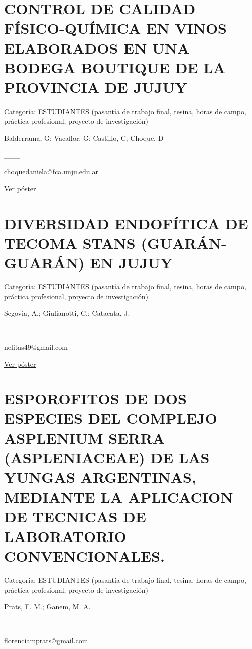 \documentclass[
  spanish,
  letterpaper,
  DIV=11,
  numbers=noendperiod]{scrreprt}
\begin{document}
\section{CONTROL DE CALIDAD FÍSICO-QUÍMICA EN VINOS ELABORADOS EN UNA
BODEGA BOUTIQUE DE LA PROVINCIA DE
JUJUY}\label{control-de-calidad-fuxedsico-quuxedmica-en-vinos-elaborados-en-una-bodega-boutique-de-la-provincia-de-jujuy}

Categoría: ESTUDIANTES (pasantía de trabajo final, tesina, horas de
campo, práctica profesional, proyecto de investigación)

Balderrama, G; Vacaflor, G; Castillo, C; Choque, D

\_\_\_

choquedaniela@fca.unju.edu.ar

\href{https://drive.google.com/open?id=1FiFlgIJVTMj8ToRvUEEq4NGfJlrsDSkq}{Ver
póster}

\section{DIVERSIDAD ENDOFÍTICA DE TECOMA STANS (GUARÁN-GUARÁN) EN
JUJUY}\label{diversidad-endofuxedtica-de-tecoma-stans-guaruxe1n-guaruxe1n-en-jujuy}

Categoría: ESTUDIANTES (pasantía de trabajo final, tesina, horas de
campo, práctica profesional, proyecto de investigación)

Segovia, A.; Giulianotti, C.; Catacata, J.

\_\_\_

nelitas49@gmail.com

\href{https://drive.google.com/open?id=1XM0YtQRaGYE5Aig6t15Lspkbp4DrMaaL}{Ver
póster}

\section{ESPOROFITOS DE DOS ESPECIES DEL COMPLEJO ASPLENIUM SERRA
(ASPLENIACEAE) DE LAS YUNGAS ARGENTINAS, MEDIANTE LA APLICACION DE
TECNICAS DE LABORATORIO
CONVENCIONALES.}\label{esporofitos-de-dos-especies-del-complejo-asplenium-serra-aspleniaceae-de-las-yungas-argentinas-mediante-la-aplicacion-de-tecnicas-de-laboratorio-convencionales.}

Categoría: ESTUDIANTES (pasantía de trabajo final, tesina, horas de
campo, práctica profesional, proyecto de investigación)

Prats, F. M.; Ganem, M. A.

\_\_\_

florenciamprats@gmail.com
\end{document}
